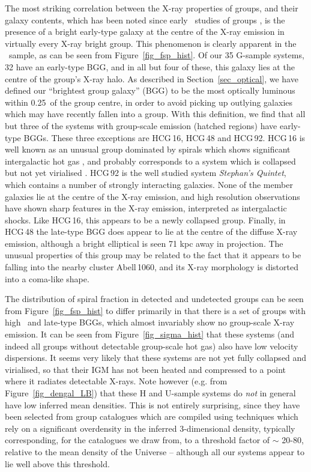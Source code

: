 \documentclass[usenatbib]{mn2e}
\begin{document}
The most striking correlation between the X-ray properties of groups, and their
galaxy contents, which has been noted since early \ROSAT\ studies of groups
\citep*{ebeling94}, is the presence of a bright early-type galaxy at the
centre of the X-ray emission in virtually every X-ray bright group.  This
phenomenon is clearly apparent in the \GEMS\ sample, as can be seen from
Figure~\ref{fig_fsp_hist}.  Of our 35 G-sample systems, 32 have an early-type
BGG, and in all but four of these, this galaxy lies at the centre of the group's
X-ray halo.  As described in Section~\ref{sec_optical}, we have defined our
``brightest group galaxy'' (BGG) to be the most optically luminous within
0.25\rfh\ of the group centre, in order to avoid picking up outlying galaxies
which may have recently fallen into a group.  With this definition, we find that
all but three of the systems with group-scale emission (hatched regions) have
early-type BGGs.  These three exceptions are HCG\,16, HCG\,48 and HCG\,92.
HCG\,16 is well known as an unusual group dominated by spirals which shows
significant intergalactic hot gas \citep{ponman96,dossantos99}, and probably
corresponds to a system which is collapsed but not yet virialised
\citep{belsole03}.  HCG\,92 is the well studied system {\it Stephan's Quintet},
which contains a number of strongly interacting galaxies.  None of the member
galaxies lie at the centre of the X-ray emission, and high resolution
observations \citep{pietsch97,sulentic01} have shown sharp features in the X-ray
emission, interpreted as intergalactic shocks.  Like HCG\,16, this appears to be
a newly collapsed group.  Finally, in HCG\,48 the late-type BGG does appear to
lie at the centre of the diffuse X-ray emission, although a bright elliptical is
seen 71 kpc away in projection.  The unusual properties of this group may be
related to the fact that it appears to be falling into the nearby cluster
Abell\,1060, and its X-ray morphology is distorted into a coma-like shape.

The distribution of spiral fraction in detected and undetected groups can be
seen from Figure~\ref{fig_fsp_hist} to differ primarily in that there is a
set of groups with high \fsp\ and late-type BGGs, which almost invariably show no
group-scale X-ray emission.  It can be seen from Figure~\ref{fig_sigma_hist} that
these systems (and indeed all groups without detectable group-scale hot gas) also
have low velocity dispersions.  It seems very likely that these systems are not
yet fully collapsed and virialised, so that their IGM has not been heated and
compressed to a point where it radiates detectable X-rays.  Note however (e.g.
from Figure~\ref{fig_dengal_LB}) that these H and U-sample systems do {\it not}
in general have low inferred mean densities.  This is not entirely surprising,
since they have been selected from group catalogues which are compiled using
techniques which rely on a significant overdensity in the inferred 3-dimensional
density, typically corresponding, for the catalogues we draw from, to a threshold
factor of $\sim$ 20-80, relative to the mean density of the Universe -- although
all our systems appear to lie well above this threshold.
\end{document}
